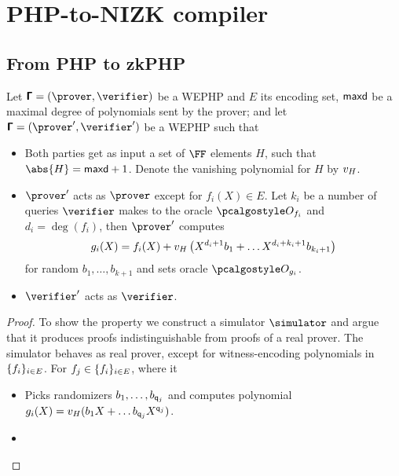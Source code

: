 \documentclass[runningheads,11pt]{llncs}
\begin{document}
\section{PHP-to-NIZK compiler}

\subsection{From PHP to zkPHP}

\begin{theorem}
  Let $\PHP = (\prover, \verifier)$ be a WEPHP and $E$ its encoding set,
  $\mathsf{maxd}$ be a maximal degree of polynomials sent by the prover; and
  let $\PHP = (\prover', \verifier')$ be a WEPHP such that
  \begin{itemize}
  \item Both parties get as input a set of $\FF$ elements $H$, such that
    $\abs{H} = \maxdeg + 1$. Denote the vanishing polynomial for $H$ by $v_{H}$.
  \item $\prover'$ acts as $\prover$ except for $f_i(X) \in E$. Let $k_i$ be a
    number of queries $\verifier$ makes to the oracle $\oracleo_{f_i}$ and
    $d_i = \deg(f_i)$, then $\prover'$ computes
      \[
        g_i(X) = f_i(X) + v_{H}\left(X^{d_i + 1} b_1 + \ldots
        X^{d_i + k_i + 1} b_{k_i + 1}\right)
      \]
      for random $b_1, \ldots, b_{k + 1}$ and sets oracle $\oracleo_{g_i}$.
    \item $\verifier'$ acts as $\verifier$. 
  \end{itemize}
\end{theorem}
\begin{proof}


   To show the property we construct a simulator
  $\simulator$ and argue that it produces proofs indistinguishable from proofs
  of a real prover. The simulator behaves as real prover, except for
  witness-encoding polynomials in $\{f_i\}_{i \in E}$. For
  $f_j \in \{f_i\}_{i \in E}$, where it
  \begin{itemize}
  \item Picks randomizers $b_1, \ldots, b_{\mathsf{q}_j}$ and computes polynomial
    $g_i(X) =  v_{H}(b_1 X + \ldots b_{\mathsf{q}_j} X^{\mathsf{q}_j})$. 
  \item {}
  \end{itemize}
  
\end{proof}
\end{document}
